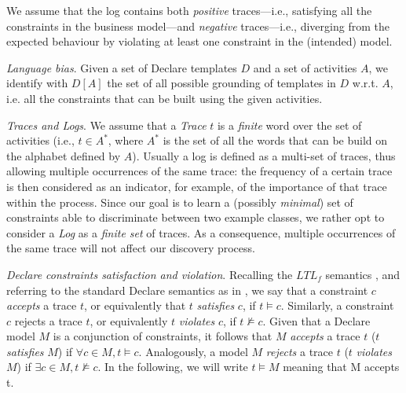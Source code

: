 \documentclass[a4wide,11pt]{article}
\theoremstyle{definition}
\theoremstyle{plain}
\newcommand\paragrafo[1]{{\smallskip \noindent \textit{#1}.}}
\begin{document}
We assume that the log contains both \emph{positive} traces---i.e., satisfying all the constraints in the business model---and \emph{negative} traces---i.e., diverging from the expected behaviour by violating at least one constraint in the (intended) model. 



\paragrafo{Language bias} Given a set of Declare templates $D$ and a set of activities $A$, we identify with $D[A]$ the set of all possible grounding of templates in $D$ w.r.t. $A$, i.e. all the constraints that can be built using the given activities.


\paragrafo{Traces and Logs} We assume that a \emph{Trace} $t$ is a \emph{finite} word over the set of activities (i.e., $t\in A^*$, where $A^*$ is the set of all the words that can be build on the alphabet defined by $A$).
%
Usually a log is defined as a multi-set of traces, thus allowing multiple occurrences of the same trace: the frequency of a certain trace is then considered as an indicator, for example, of the importance of that trace within the process. Since our goal is to learn a (possibly \emph{minimal}) set of constraints able to discriminate between two example classes, we rather opt to consider a \emph{Log} as a \emph{finite set} of traces. As a consequence, multiple occurrences of the same trace will not affect our discovery process.
%

\paragrafo{Declare constraints satisfaction and violation} Recalling the $LTL_f$ semantics \cite{DBLP:journals/tweb/MontaliPACMS10,DBLP:conf/ijcai/GiacomoV13}, and referring to the standard Declare semantics as in \cite{2008-Pesic}, we say that a constraint $c$ \emph{accepts} a trace $t$, or equivalently that $t$ \emph{satisfies} $c$, if $t \models c$. Similarly, a constraint $c$ rejects a trace $t$, or equivalently $t$ \emph{violates} $c$, if $t \not\models c$. Given that a Declare model $M$ is a conjunction of constraints, it follows that $M$ \emph{accepts} a trace $t$ ($t$ \emph{satisfies} $M$) if $\forall c \in M, t \models c$. Analogously, a model $M$ \emph{rejects} a trace $t$ ($t$ \emph{violates} $M$) if $\exists c \in M, t\not\models c$. In the following, we will write $t \models M$ meaning that M accepts t.
\end{document}
